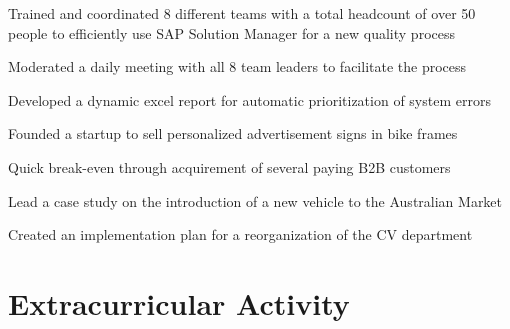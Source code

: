 \documentclass[letterpaper]{deedy-resume} %
\begin{document}
\begin{minipage}[t]{0.66\textwidth}
\begin{tightitemize}
\item Trained and coordinated 8 different teams with a total headcount of over 50 people to efficiently use SAP Solution Manager for a new quality process
\item Moderated a daily meeting with all 8 team leaders to facilitate the process
\item Developed a dynamic excel report for automatic prioritization of system errors
\end{tightitemize}

\sectionspace %



\begin{tightitemize}
\item Founded a startup to sell personalized advertisement signs in bike frames
\item Quick break-even through acquirement of several paying B2B customers
\end{tightitemize}

\sectionspace %



\begin{tightitemize}
\item Lead a case study on the introduction of a new vehicle to the Australian Market
\item Created an implementation plan for a reorganization of the CV department
\end{tightitemize}



\section{Extracurricular Activity}



\end{minipage}
\end{document}
